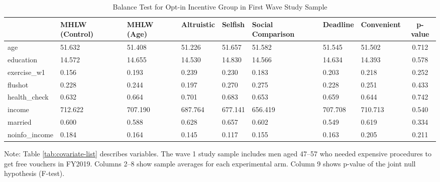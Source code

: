 \begin{table}[!h]

\caption{Balance Test for Opt-in Incentive Group in First Wave Study Sample \label{tab:int-coupon0-balance}}
\centering
\fontsize{9}{11}\selectfont
\begin{threeparttable}
\begin{tabular}[t]{l>{\centering\arraybackslash}p{3em}>{\centering\arraybackslash}p{3em}>{\centering\arraybackslash}p{3em}>{\centering\arraybackslash}p{3em}>{\centering\arraybackslash}p{3em}>{\centering\arraybackslash}p{3em}>{\centering\arraybackslash}p{3em}c}
\toprule
  & MHLW (Control) & MHLW (Age) & Altruistic & Selfish & Social Comparison & Deadline & Convenient & p-value\\
\midrule
age & \num{51.632} & \num{51.408} & \num{51.226} & \num{51.657} & \num{51.582} & \num{51.545} & \num{51.502} & \num{0.712}\\
education & \num{14.572} & \num{14.655} & \num{14.530} & \num{14.830} & \num{14.566} & \num{14.634} & \num{14.393} & \num{0.578}\\
exercise\_w1 & \num{0.156} & \num{0.193} & \num{0.239} & \num{0.230} & \num{0.183} & \num{0.203} & \num{0.218} & \num{0.252}\\
flushot & \num{0.228} & \num{0.244} & \num{0.197} & \num{0.270} & \num{0.275} & \num{0.228} & \num{0.251} & \num{0.433}\\
health\_check & \num{0.632} & \num{0.664} & \num{0.701} & \num{0.683} & \num{0.653} & \num{0.659} & \num{0.644} & \num{0.742}\\
income & \num{712.622} & \num{707.190} & \num{687.764} & \num{677.141} & \num{656.419} & \num{707.708} & \num{710.713} & \num{0.540}\\
married & \num{0.600} & \num{0.588} & \num{0.628} & \num{0.657} & \num{0.602} & \num{0.549} & \num{0.619} & \num{0.334}\\
noinfo\_income & \num{0.184} & \num{0.164} & \num{0.145} & \num{0.117} & \num{0.155} & \num{0.163} & \num{0.205} & \num{0.211}\\
\bottomrule
\end{tabular}
\begin{tablenotes}
\item Note: Table \ref{tab:covariate-list} describes variables. The wave 1 study sample includes men aged 47--57 who needed expensive procedures to get free vouchers in FY2019. Columns 2--8 show sample averages for each experimental arm. Column 9 shows p-value of the joint null hypothesis (F-test).
\end{tablenotes}
\end{threeparttable}
\end{table}
